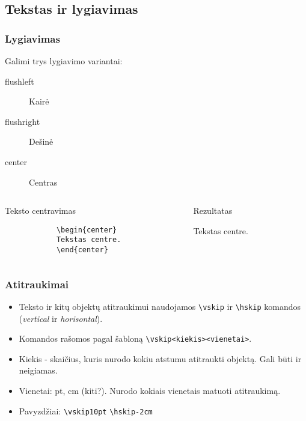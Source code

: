 \documentclass[11pt,a4paper]{beamer}
\begin{document}
\subsection{Tekstas ir lygiavimas}
\begin{frame}[fragile]
    \frametitle{Lygiavimas}
    Galimi trys lygiavimo variantai:
    \begin{description}
    	\item[flushleft] Kairė
    	\item[flushright] Dešinė
    	\item[center] Centras
    \end{description}  
    \begin{columns}[t]
        \begin{column}{5cm}
    \begin{block}{Teksto centravimas}
        \begin{lstlisting}
			\begin{center}
			Tekstas centre.
			\end{center}
        \end{lstlisting}
    \end{block}
        \end{column}
        \begin{column}{5cm}
            \begin{block}{Rezultatas}
                \begin{center}
                Tekstas centre.
                \end{center}
            \end{block}
        \end{column}
    \end{columns}    
\end{frame}

\begin{frame}[fragile]
	\frametitle{Atitraukimai}
	\begin{itemize}
		\item Teksto ir kitų objektų atitraukimui naudojamos \verb|\vskip| ir \verb|\hskip| komandos (\textit{vertical} ir \textit{horisontal}).
		\item Komandos rašomos pagal šabloną \verb|\vskip<kiekis><vienetai>|.
		\item Kiekis - skaičius, kuris nurodo kokiu atstumu atitraukti objektą. Gali būti ir neigiamas.
		\item Vienetai: pt, cm (kiti?).  Nurodo kokiais vienetais matuoti atitraukimą.
		\item Pavyzdžiai: \verb|\vskip10pt| \verb|\hskip-2cm|
	\end{itemize}
\end{frame}
\end{document}
